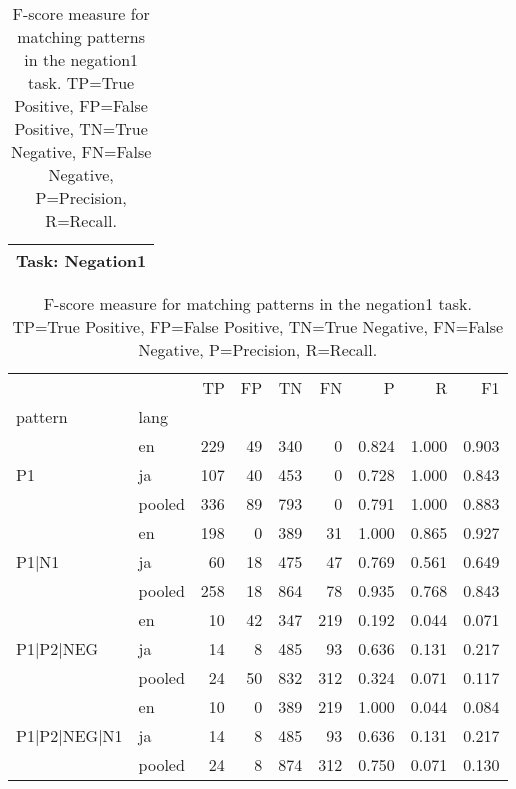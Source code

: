 
\begin{table}[h!]
\centering
\begin{tabular}{p{}}
\toprule
\textbf{Task: Negation1} \\
\midrule
\end{tabular}
\vspace{10pt}
\begin{tabular}{llrrrrrrr}
\toprule
 &  & TP & FP & TN & FN & P & R & F1 \\
pattern & lang &  &  &  &  &  &  &  \\
\midrule
\multirow[t]{3}{*}{P1} & en & 229 & 49 & 340 & 0 & 0.824 & 1.000 & 0.903 \\
 & ja & 107 & 40 & 453 & 0 & 0.728 & 1.000 & 0.843 \\
 & pooled & 336 & 89 & 793 & 0 & 0.791 & 1.000 & 0.883 \\
\cline{1-9}
\multirow[t]{3}{*}{P1|N1} & en & 198 & 0 & 389 & 31 & 1.000 & 0.865 & 0.927 \\
 & ja & 60 & 18 & 475 & 47 & 0.769 & 0.561 & 0.649 \\
 & pooled & 258 & 18 & 864 & 78 & 0.935 & 0.768 & 0.843 \\
\cline{1-9}
\multirow[t]{3}{*}{P1|P2|NEG} & en & 10 & 42 & 347 & 219 & 0.192 & 0.044 & 0.071 \\
 & ja & 14 & 8 & 485 & 93 & 0.636 & 0.131 & 0.217 \\
 & pooled & 24 & 50 & 832 & 312 & 0.324 & 0.071 & 0.117 \\
\cline{1-9}
\multirow[t]{3}{*}{P1|P2|NEG|N1} & en & 10 & 0 & 389 & 219 & 1.000 & 0.044 & 0.084 \\
 & ja & 14 & 8 & 485 & 93 & 0.636 & 0.131 & 0.217 \\
 & pooled & 24 & 8 & 874 & 312 & 0.750 & 0.071 & 0.130 \\
\cline{1-9}
\bottomrule
\end{tabular}
\caption{F-score measure for matching patterns in the negation1 task. TP=True Positive, FP=False Positive, TN=True Negative, FN=False Negative, P=Precision, R=Recall.}
\label{tab:negation1_f1}
\end{table}
